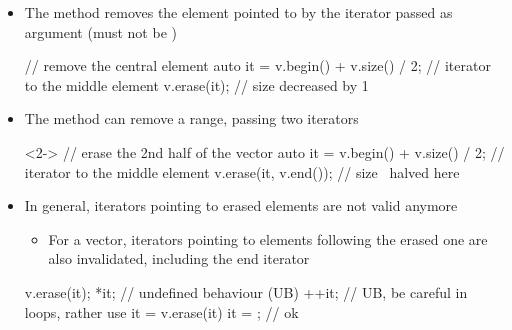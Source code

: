 \begin{frame}[fragile]{ \insertcontinuationtext}

  \begin{itemize}
  \item The  method removes the element pointed to by the iterator
    passed as argument (must not be )
    \begin{codeblock}
// remove the central element
auto it = v.begin() + v.size() / 2; // iterator to the middle element
v.erase(it);                        // size decreased by 1\end{codeblock}

  \item<2-> The  method can remove a range, passing two iterators
    \begin{codeblock}<2->{
// erase the 2nd half of the vector
auto it = v.begin() + v.size() / 2; // iterator to the middle element
v.erase(it, v.end());               // size ~halved here}\end{codeblock}

\item<3-> In general, iterators pointing to erased elements are not valid anymore
  \begin{itemize}
  \item For a vector, iterators pointing to elements following the erased one are
    also invalidated, including the end iterator
  \end{itemize}
  \begin{codeblock}
v.erase(it);
*it;       // undefined behaviour (UB)
++it;      // UB, be careful in loops, rather use it = v.erase(it)
it = \ddd;  // ok\end{codeblock}
\end{itemize}

\end{frame}

